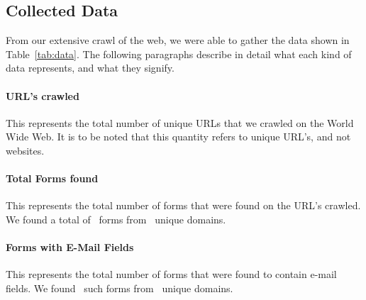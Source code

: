 \subsection{Collected Data}
From our extensive crawl of the web, we were able to gather the data shown in Table~\ref{tab:data}. The following paragraphs describe in detail what each kind of data represents, and what they signify.



\paragraph{URL's crawled}
This represents the total number of unique URLs that we crawled on the World Wide Web. It is to be noted that this quantity refers to unique URL's, and not websites.

\paragraph{Total Forms found}
This represents the total number of forms that were found on the URL's crawled. We found a total of \forms\ forms from 
\uniqueforms\ unique domains.

\paragraph{Forms with E-Mail Fields}
This represents the total number of forms that were found to contain e-mail fields. We found \emailforms\ such forms from \uniqueemailforms\ unique domains.
